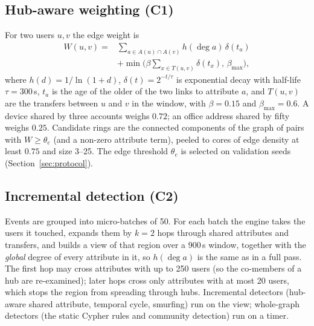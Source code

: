 \subsection{Hub-aware weighting (C1)}
For two users $u,v$ the edge weight is
\begin{equation}
\begin{split}
W(u,v)={}&\sum_{a\in A(u)\cap A(v)} h(\deg a)\,\delta(t_a)\\
&+\min\Big(\beta\sum_{x\in T(u,v)}\delta(t_x),\,\beta_{\max}\Big),
\end{split}
\label{eq:w}
\end{equation}
where $h(d)=1/\ln(1+d)$, $\delta(t)=2^{-t/\tau}$ is exponential decay with
half-life $\tau=300$\,s, $t_a$ is the age of the older of the two links to
attribute $a$, and $T(u,v)$ are the transfers between $u$ and $v$ in the
window, with $\beta=0.15$ and $\beta_{\max}=0.6$. A device shared by three
accounts weighs $0.72$; an office address shared by fifty weighs $0.25$.
Candidate rings are the connected components of the graph of pairs with
$W\ge\theta_e$ (and a non-zero attribute term), peeled to cores of edge density
at least $0.75$ and size 3--25. The edge threshold $\theta_e$ is selected on
validation seeds (Section~\ref{sec:protocol}).

\subsection{Incremental detection (C2)}
Events are grouped into micro-batches of 50. For each batch the engine takes
the users it touched, expands them by $k=2$ hops through shared attributes and
transfers, and builds a view of that region over a 900\,s window, together with
the \emph{global} degree of every attribute in it, so $h(\deg a)$ is the same as
in a full pass. The first hop may cross attributes with up to 250 users (so the
co-members of a hub are re-examined); later hops cross only attributes with at
most 20 users, which stops the region from spreading through hubs. Incremental
detectors (hub-aware shared attribute, temporal cycle, smurfing) run on the
view; whole-graph detectors (the static Cypher rules and community detection)
run on a timer.

